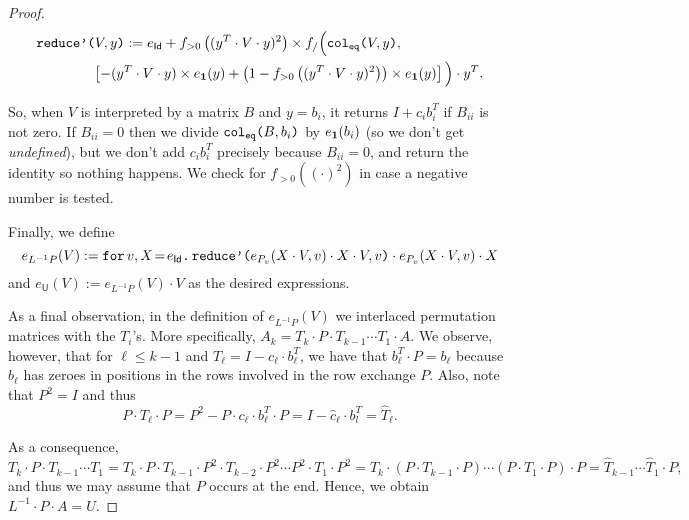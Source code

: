 \begin{proof}
    \begin{align*}
        &\redd{V}{y}:= e_{\mathsf{Id}}+ f_{>0}\left( ( y^T\cdot V\cdot y)^2 \right)\times f_/\Big(\ccoleq{V}{y}, \\
        &\hspace{4em}\left[ -(y^T\cdot V\cdot y)\times e_{\ones}(y) + \left( 1 - f_{>0}\left( ( y^T\cdot V\cdot y)^2 \right) \right)\times e_{\ones}(y) \right]\Big)\cdot y^T. \\
    \end{align*}

    
    So, when $V$ is interpreted by a matrix $B$ and $y=b_i$, it returns $I+c_ib_i^T$ if $B_{ii}$ is not zero. 
    If $B_{ii}=0$ then we divide $\ccoleq{B}{b_i}$ by $e_{\ones}(b_i)$ (so we don't get \textit{undefined}), 
    but we don't add $c_ib_i^T$ precisely because $B_{ii}=0$, and return the identity so nothing happens. We check 
    for $f_{>0}((\cdot)^2)$ in case a negative number is tested.

    Finally, we define
    $$
    e_{L^{-1}P}(V):=\initf{e_{\mathsf{Id}}}{v}{X}{\redd{e_{P_v}(X\cdot V,v)\cdot X\cdot V}{v}\cdot e_{P_v}(X\cdot V,v)\cdot X}
    $$
    and $e_{\mathsf{U}}(V):=e_{L^{-1}P}(V)\cdot V$ as the desired expressions.

    As a final observation, in the definition of $e_{L^{-1}P}(V)$ 
    we interlaced permutation matrices with the $T_i$'s. More specifically, 
    $A_k=T_k\cdot P\cdot T_{k-1}\cdots T_1\cdot A$. We observe, however, that for $\ell\leq k-1$ and
    $T_{\ell}=I-c_\ell\cdot b_\ell^T$, we have that  $b_\ell^T\cdot P=b_\ell$ because $b_\ell$ has zeroes in positions in the rows involved in the row exchange $P$. Also, note that  $P^2=I$ and thus 
    $$P\cdot T_\ell\cdot P=P^2-P\cdot c_\ell\cdot b_\ell^T\cdot P=I-\widehat{c}_\ell\cdot b_l^T=\widehat{T}_\ell.$$

    As a consequence,
    $$
    T_k\cdot P\cdot T_{k-1}\cdots T_1=T_k\cdot P\cdot T_{k-1}\cdot P^2\cdot T_{k-2}\cdot P^2\cdots P^2 \cdot T_1\cdot P^2=T_k\cdot (P\cdot T_{k-1}\cdot P)\cdots (P\cdot T_1\cdot P)\cdot P=\widehat{T}_{k-1}\cdots \widehat{T}_1\cdot P,
    $$
    and thus we may assume that $P$ occurs at the end. Hence, we obtain $L^{-1}\cdot P\cdot A=U$.
\end{proof}
